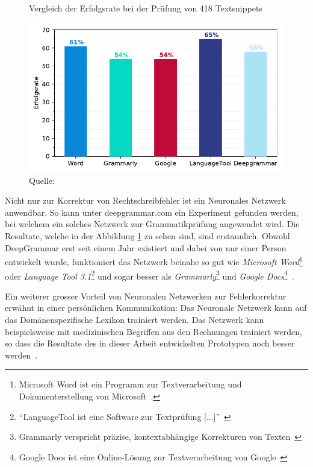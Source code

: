 \begin{figure}[h!] %
    \centering
    \captionsetup{width=.9\linewidth}
    \caption{Vergleich der Erfolgsrate bei der Prüfung von 418 Textsnippets}
    \label{deepgrammar}
    \includegraphics{graphics/matplot/grammar-tools.pdf}
    \caption*{Quelle: \textcite{Mugan}}
\end{figure} %
Nicht nur zur Korrektur von Rechtschreibfehler ist ein Neuronales Netzwerk anwendbar. So kann unter deepgrammar.com ein Experiment gefunden werden, bei welchem ein solches Netzwerk zur Grammatikprüfung angewendet wird. Die Resultate, welche in der Abbildung \ref{deepgrammar} zu sehen sind, sind erstaunlich. Obwohl DeepGrammar erst seit einem Jahr existiert und dabei von nur einer Person entwickelt wurde, funktioniert das Netzwerk beinahe so gut wie \textit{Microsoft Word}\footnote{Microsoft Word ist ein Programm zur Textverarbeitung und Dokumenterstellung von Microsoft~\autocite{MicrosoftCorporation2018}.} oder \textit{Language Tool 3.1}\footnote{\enquote{LanguageTool ist eine Software zur Textprüfung [...]}~\autocite{LanguageTool2018}} und sogar besser als \textit{Grammarly}\footnote{Grammarly verspricht präzise, kontextabhängige Korrekturen von Texten~\autocite{GramarlyInc.2018}} und \textit{Google Docs}\footnote{Google Docs ist eine Online-Lösung zur Textverarbeitung von Google~\autocite{GoogleLLC2018}}~\autocite{Mugan}.


Ein weiterer grosser Vorteil von Neuronalen Netzwerken zur Fehlerkorrektur erwähnt \textcite{Mugan2018} in einer persönlichen Kommunikation: Das Neuronale Netzwerk kann auf das Domänenspezifische Lexikon trainiert werden. Das Netzwerk kann beispielsweise mit medizinischen Begriffen aus den Rechnungen trainiert werden, so dass die Resultate des in dieser Arbeit entwickelten Prototypen noch besser werden~\autocite{Mugan2018}.

